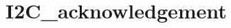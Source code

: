 \hypertarget{group___i2_c__acknowledgement}{\section{I2\-C\-\_\-acknowledgement}
\label{group___i2_c__acknowledgement}
}
